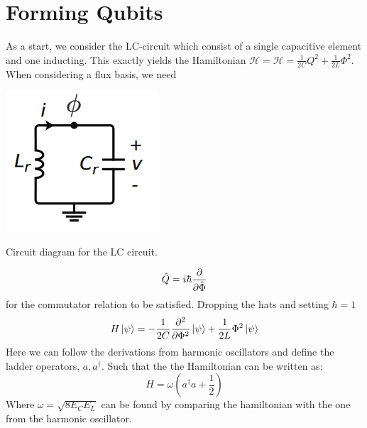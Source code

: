 \section{Forming Qubits}
As a start, we consider the LC-circuit which consist of a single capacitive element and one inducting. This exactly yields the Hamiltonian $\mathcal{H} = \mathcal{H} = \frac{1}{2C} Q^2 + \frac{1}{2L} \Phi^2$. When considering a flux basis, we need 
\begin{marginfigure}[1 cm]
    \includegraphics[width = \linewidth]{tex/fig_for_text/LC_circuit.png}
    \caption{Circuit diagram for the LC circuit.}
\end{marginfigure}
\begin{equation}
    \hat{Q} = i\hbar \frac{\partial }{\partial \hat{\Phi}}
\end{equation}
for the commutator relation to be satisfied. Dropping the hats and setting $\hbar = 1$
\begin{equation}
    H \ket{\psi} = - \frac{1}{2C} \frac{\partial^2 }{\partial \Phi^2}\ket{\psi} + \frac{1}{2L} \Phi^2 \ket{\psi}
\end{equation}
Here we can follow the derivations from harmonic oscillators and define the ladder operators, $a, a^\dagger$. Such that the the Hamiltonian can be written as:
\begin{equation}
    H = \omega (a^\dagger a + \frac12)
\end{equation}
Where $\omega = \sqrt{8 E_C E_L}$ can be found by comparing the hamiltonian with the one from the harmonic oscillator.

